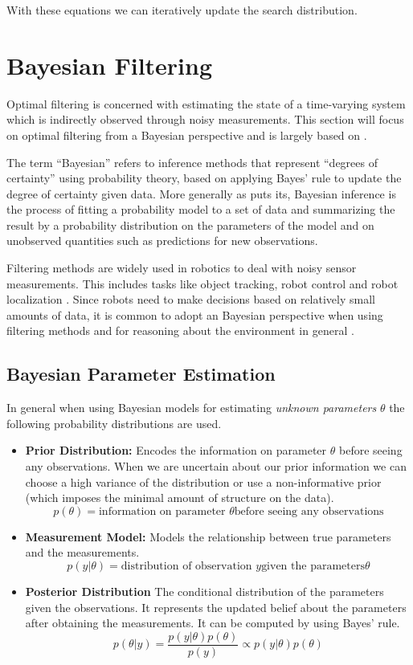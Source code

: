 With these equations we can iteratively update the search distribution.

\section{Bayesian Filtering}
Optimal filtering is concerned with estimating the state
of a time-varying system
which is indirectly observed through noisy measurements.
This section will focus on optimal filtering from a Bayesian perspective
and is largely based on \citet{sarkka2013bayesian}.

The term ``Bayesian'' refers to inference methods that represent
``degrees of certainty'' using probability theory, based on applying
Bayes' rule to update the degree of certainty given data.
More generally as \citet{gelman2013bayesian} puts its, Bayesian inference
is the process of fitting a probability model
to a set of data and summarizing the result by a probability distribution
on the parameters of the model and on unobserved quantities such
as predictions for new observations.

Filtering methods are widely used in robotics
to deal with noisy sensor measurements. This
includes tasks like object tracking, robot control and
robot localization \citep{chen2011kalman}.
Since robots need to make decisions based on relatively small amounts
of data, it is common to adopt an Bayesian perspective when
using filtering methods and for 
reasoning about the environment in general \citep{thrun2002probabilistic}.

\subsection{Bayesian Parameter Estimation}
In general when using Bayesian models for estimating
\textit{unknown parameters} $\theta$ the following probability distributions
are used.

\begin{itemize}
\item \textbf{Prior Distribution:}
Encodes the information on parameter $\theta$ before seeing any
observations. When we are uncertain about our prior information
we can choose a high variance of the distribution or use a
non-informative prior (which imposes the minimal amount of structure
on the data).
$$ p(\theta) = \text{information on parameter } \theta
\text{before seeing any observations} $$

\item \textbf{Measurement Model:}
Models the relationship between true parameters and the measurements.
$$ p(y | \theta) = \text{distribution of observation } y
\text{given the parameters} \theta $$

\item \textbf{Posterior Distribution}
The conditional distribution of the parameters given the observations.
It represents the updated belief about the parameters
after obtaining the measurements. It can be computed by using Bayes' rule.
$$ p(\theta | y) = \frac{p(y | \theta) p(\theta)}{p(y)}
\propto p(y | \theta) p(\theta) $$
\end{itemize}

